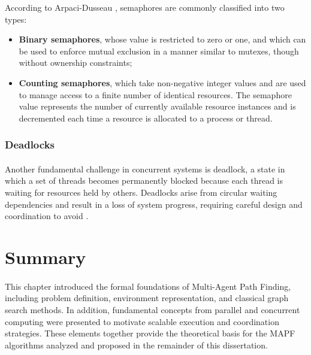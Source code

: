 According to Arpaci-Dusseau \cite{arpaci2018operating}, semaphores are commonly
classified into two types:
\begin{itemize}
    \item \textbf{Binary semaphores}, whose value is restricted to zero or one, and which can be
    used to enforce mutual exclusion in a manner similar to mutexes, though without ownership
    constraints;
\item \textbf{Counting semaphores}, which take non-negative integer values and are used to
manage access to a finite number of identical resources. The semaphore value represents the
number of currently available resource instances and is decremented each time a resource is
allocated to a process or thread.

\end{itemize}


\subsubsection{Deadlocks}
\paragraph{}

Another fundamental challenge in concurrent systems is deadlock, a state in which a set
of threads becomes permanently blocked because each thread is waiting for resources held by
others. Deadlocks arise from circular waiting dependencies and result in a loss of system
progress, requiring careful design and coordination to avoid
\cite{silberschatz2018operating}.




\section{Summary}
\paragraph{}

This chapter introduced the formal foundations of Multi-Agent Path Finding, including problem
definition, environment representation, and classical graph search methods. In addition,
fundamental concepts from parallel and concurrent computing were presented to motivate scalable
execution and coordination strategies. These elements together provide the theoretical basis for
the MAPF algorithms analyzed and proposed in the remainder of this dissertation.